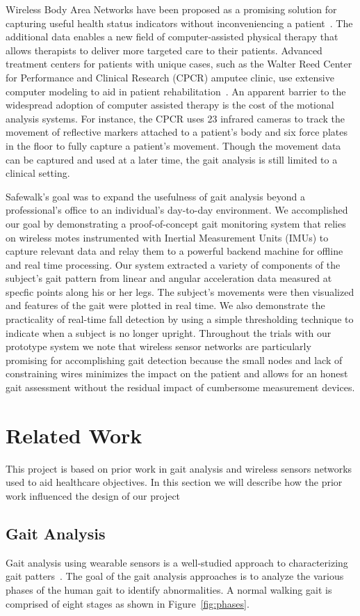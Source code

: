 \documentclass[conference]{IEEEtran}
\newcommand{\sys}{Safewalk\xspace}
\begin{document}
Wireless Body Area Networks have been proposed as a promising solution for capturing
useful health status indicators without inconveniencing a patient~\cite{msban,wban}. The
additional data enables a new field of computer-assisted physical therapy that allows
therapists to deliver more targeted care to their patients. Advanced treatment centers for
patients with unique cases, such as the Walter Reed Center for Performance and Clinical
Research (CPCR) amputee clinic, use extensive computer modeling to aid in patient
rehabilitation~\cite{cpcr}.  An apparent barrier to the widespread adoption of computer
assisted therapy is the cost of the motional analysis systems. For instance, the CPCR uses
23 infrared cameras to track the movement of reflective markers attached to a patient's
body and six force plates in the floor to fully capture a patient's movement. Though the
movement data can be captured and used at a later time, the gait analysis is still limited
to a clinical setting. 
  
\sys's goal was to expand the usefulness of gait analysis beyond a professional’s
office to an individual’s day-to-day environment. We accomplished our goal by
demonstrating a proof-of-concept gait monitoring system that relies on wireless motes
instrumented with Inertial Measurement Units (IMUs) to capture relevant data and relay
them to a powerful backend machine for offline and real time processing. Our system
extracted a variety of components of the subject's gait pattern from linear and angular
acceleration data measured at specfic points along his or her legs. The subject's
movements were then visualized and features of the gait were plotted in real time. We also
demonstrate the practicality of real-time fall detection by using a simple thresholding
technique to indicate when a subject is no longer upright. Throughout the trials with our
prototype system we note that wireless sensor networks are particularly promising for
accomplishing gait detection because the small nodes and lack of constraining wires
minimizes the impact on the patient and allows for an honest gait assessment without the
residual impact of cumbersome measurement devices. 
\section{Related Work}
This project is based on prior work in gait analysis and wireless sensors networks used to
aid healthcare objectives. In this section we will describe how the prior work influenced
the design of our project 
\subsection{Gait Analysis}
Gait analysis using wearable sensors is a well-studied approach to characterizing gait
patters~\cite{gaits}. The goal of the gait analysis approaches is to analyze the various phases of
the human gait to identify abnormalities. A normal walking gait is comprised of eight
stages as shown in Figure~\ref{fig:phases}. 
\end{document}
